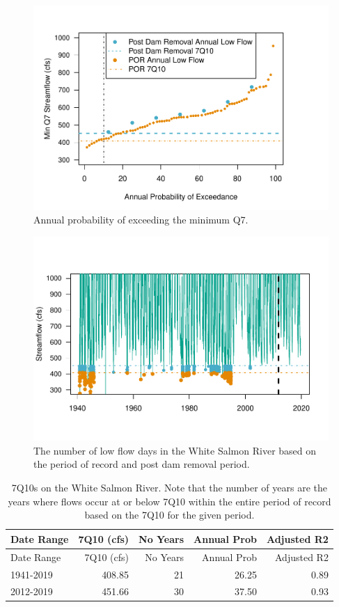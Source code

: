 \documentclass[
  12pt,
]{article}
\begin{document}
\begin{figure}
\centering
\includegraphics{WhiteSalmon_WriteUp_files/figure-latex/fig6-1.pdf}
\caption{Annual probability of exceeding the minimum Q7.}
\end{figure}

\begin{figure}
\centering
\includegraphics{WhiteSalmon_WriteUp_files/figure-latex/fig7-1.pdf}
\caption{The number of low flow days in the White Salmon River based on
the period of record and post dam removal period.}
\end{figure}

\begin{longtable}[]{@{}lrrrr@{}}
\caption{7Q10s on the White Salmon River. Note that the number of years
are the years where flows occur at or below 7Q10 within the entire
period of record based on the 7Q10 for the given period.}\tabularnewline
\toprule
Date Range & 7Q10 (cfs) & No Years & Annual Prob & Adjusted
R2\tabularnewline
\midrule
\endfirsthead
\toprule
Date Range & 7Q10 (cfs) & No Years & Annual Prob & Adjusted
R2\tabularnewline
\midrule
\endhead
1941-2019 & 408.85 & 21 & 26.25 & 0.89\tabularnewline
2012-2019 & 451.66 & 30 & 37.50 & 0.93\tabularnewline
\bottomrule
\end{longtable}
\end{document}
